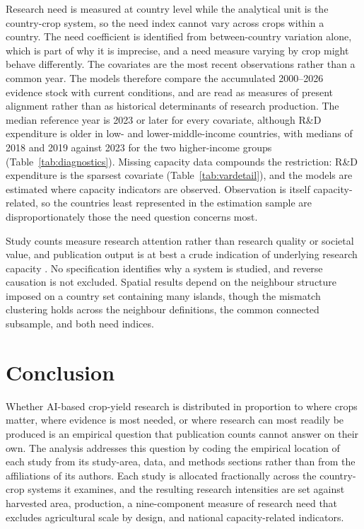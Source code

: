 \documentclass[ASNA,twocolumn]{USG}
\begin{document}
Research need is measured at country level while the analytical unit is the country-crop
system, so the need index cannot vary across crops within a country. The need coefficient is
identified from between-country variation alone, which is part of why it is imprecise, and a
need measure varying by crop might behave differently. The covariates are the most recent observations rather than a common year. The models therefore
compare the accumulated 2000--2026 evidence stock with current conditions, and are read as
measures of present alignment rather than as historical determinants of research production. The
median reference year is 2023 or later for every covariate, although R\&D expenditure is older in
low- and lower-middle-income countries, with medians of 2018 and 2019 against 2023 for the two
higher-income groups (Table~\ref{tab:diagnostics}). Missing capacity data compounds the restriction: R\&D expenditure
is the sparsest covariate (Table~\ref{tab:vardetail}), and the models are estimated where
capacity indicators are observed. Observation is itself capacity-related, so the countries
least represented in the estimation sample are disproportionately those the need question
concerns most.

Study counts measure research attention rather than research quality or societal value, and
publication output is at best a crude indication of underlying research capacity
\cite{CashGibson2018}. No specification identifies why a system is studied, and reverse causation is not excluded. Spatial results depend
on the neighbour structure imposed on a country set containing many islands, though the
mismatch clustering holds across the neighbour definitions, the common connected subsample,
and both need indices.

\section{Conclusion}

Whether AI-based crop-yield research is distributed in proportion to where crops matter, where
evidence is most needed, or where research can most readily be produced is an empirical
question that publication counts cannot answer on their own. The analysis addresses this question by coding the empirical location of each study from its
study-area, data, and methods sections rather than from the affiliations of its authors. Each
study is allocated fractionally across the country-crop systems it examines, and the resulting
research intensities are set against harvested area, production, a nine-component measure of
research need that excludes agricultural scale by design, and national capacity-related
indicators.
\end{document}

